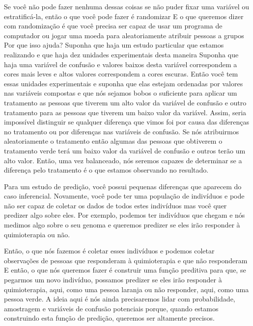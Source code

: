 \begin{multicols}{2}
\begin{footnotesize}
Se você não pode fazer nenhuma dessas coisas se não puder fixar uma variável ou estratificá-la, então o que você pode fazer é randomizar E o que queremos dizer com randomização é que você precisa ser capaz de usar um programa de computador ou jogar uma moeda para aleatoriamente atribuir pessoas a grupos Por que isso ajuda? Suponha que haja um estudo particular que estamos realizando e que haja dez unidades experimentais desta maneira Suponha que haja uma variável de confusão e valores baixos desta variável correspondem a cores mais leves e altos valores correspondem a cores escuras. Então você tem essas unidades experimentais e suponha que elas estejam ordenadas por valores nas variáveis compostas e que nós sejamos bobos o suficiente para aplicar um tratamento as pessoas que tiverem um alto valor da variável de confusão e outro tratamento para as pessoas que tiverem um baixo valor da variável. Assim, seria impossível distinguir se qualquer diferença que vimos foi por causa das diferenças no tratamento ou por diferenças nas variáveis de confusão. Se nós atribuirmos aleatoriamente o tratamento então algumas das pessoas que obtiverem o tratamento verde terá um baixo valor da variável de confusão e outros terão um alto valor. Então, uma vez balanceado, nós seremos capazes de determinar se a diferença pelo tratamento é o que estamos observando no resultado. 

Para um estudo de predição, você possui pequenas diferenças que aparecem do caso inferencial. Novamente, você pode ter uma população de indivíduos e pode não ser capaz de coletar os dados de todos estes indivíduos mas você quer predizer algo sobre eles. Por exemplo, podemos ter indivíduos que chegam e nós medimos algo sobre o seu genoma e queremos predizer se eles  irão responder à quimioterapia ou não. 

Então, o que nós fazemos é coletar esses indivíduos e podemos coletar observações de pessoas que responderam à quimioterapia e que não responderam E então, o que nós queremos fazer é construir uma função preditiva para que, se pegarmos um novo indivíduo, possamos predizer se eles irão responder à quimioterapia, aqui, como uma pessoa laranja ou não responder, aqui, como uma pessoa verde. A ideia aqui é nós ainda precisaremos lidar com probabilidade, amostragem e variáveis de confusão potenciais porque, quando estamos construindo esta função de predição, queremos ser altamente precisos. 


\end{footnotesize}
\end{multicols}
